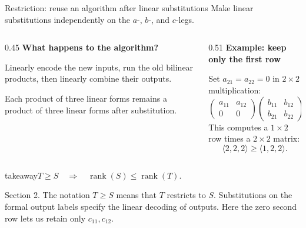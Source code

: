 \documentclass[aspectratio=169,11pt]{beamer}
\newcommand{\rank}{\operatorname{rank}}
\newcommand{\cmm}[3]{\langle #1,#2,#3\rangle}
\newcommand{\source}[1]{\vfill\par{\fontsize{7.5}{9}\selectfont\color{muted}#1\par}}
\newcommand{\takeaway}[1]{\begin{beamercolorbox}[sep=0.65em,wd=\linewidth]{takeaway}#1\end{beamercolorbox}}
\begin{document}
\begin{frame}{Restriction: reuse an algorithm after linear substitutions}
  Make linear substitutions independently on the $a$-, $b$-, and $c$-legs.
  \par\medskip
  \begin{columns}[T,onlytextwidth]
    \begin{column}{0.45\textwidth}
      \textbf{What happens to the algorithm?}\par\smallskip
      Linearly encode the new inputs, run the old bilinear products,
      then linearly combine their outputs.
      \par\medskip
      Each product of three linear forms remains a product of three
      linear forms after substitution.
    \end{column}
    \begin{column}{0.51\textwidth}
      \textbf{Example: keep only the first row}\par\smallskip
      Set $a_{21}=a_{22}=0$ in $2\times2$ multiplication:
      \[
        \begin{pmatrix}a_{11}&a_{12}\\0&0\end{pmatrix}
        \begin{pmatrix}b_{11}&b_{12}\\b_{21}&b_{22}\end{pmatrix}
        =\begin{pmatrix}c_{11}&c_{12}\\0&0\end{pmatrix}.
      \]
      This computes a $1\times2$ row times a $2\times2$ matrix:
      \[
        \cmm{2}{2}{2}\ge\cmm{1}{2}{2}.
      \]
    \end{column}
  \end{columns}
  \medskip
  \takeaway{$\displaystyle T\ge S\quad\Longrightarrow\quad
    \rank(S)\le\rank(T).$}
  \source{Section 2. The notation $T\ge S$ means that $T$ restricts to $S$.
  Substitutions on the formal output labels specify the linear decoding
  of outputs. Here the zero second row lets us retain only $c_{11},c_{12}$.}
\end{frame}
\end{document}
